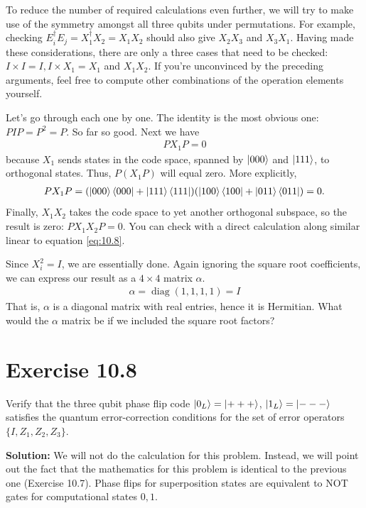 \documentclass{book}
\DeclareMathOperator{\diag}{diag}
\begin{document}
    To reduce the number of required calculations even further, we will try to make use of the symmetry amongst all three qubits under permutations. For example, checking $E_i^\dagger E_j = X_1^\dagger X_2 = X_1 X_2$ should also give $X_2 X_3$ and $X_3 X_1$. Having made these considerations, there are only a three cases that need to be checked: $I\times I = I, I\times X_1 = X_1$ and $X_1 X_2$. If you're unconvinced by the preceding arguments, feel free to compute other combinations of the operation elements yourself. 
    
    Let's go through each one by one. The identity is the most obvious one: $P I P = P^2 = P$. So far so good. Next we have
    \begin{align}
        P X_1 P = 0
    \end{align}
    because $X_1$ sends states in the code space, spanned by $\ket{000}$ and $\ket{111}$, to orthogonal states. Thus, $P (X_1 P)$ will equal zero. More explicitly,
    \begin{align} \label{eq:10.8}
        P X_1 P = (\ket{000}\bra{000} + \ket{111}\bra{111})(\ket{100} \bra{100}+ \ket{011}\bra{011}) = 0.
    \end{align}
    Finally, $X_1 X_2$ takes the code space to yet another orthogonal subspace, so the result is zero: $P X_1 X_2 P = 0$. You can check with a direct calculation along similar linear to equation \eqref{eq:10.8}.

    Since $X_i^2 = I$, we are essentially done. Again ignoring the square root coefficients, we can express our result as a $4\times4$ matrix $\alpha$.
    \begin{align}
        \alpha = \diag (1, 1, 1, 1) = I
    \end{align}
    That is, $\alpha$ is a diagonal matrix with real entries, hence it is Hermitian. What would the $\alpha$ matrix be if we included the square root factors?

\section*{Exercise 10.8}
    Verify that the three qubit phase flip code $\ket{0_L} = \ket{+++}$, $\ket{1_L} = \ket{---}$ satisfies the quantum error-correction conditions for the set of error operators $\{I, Z_1, Z_2, Z_3\}$.

    \textbf{Solution:} We will not do the calculation for this problem. Instead, we will point out the fact that the mathematics for this problem is identical to the previous one (Exercise 10.7). Phase flips for superposition states are equivalent to NOT gates for computational states $0, 1$.
\end{document}
